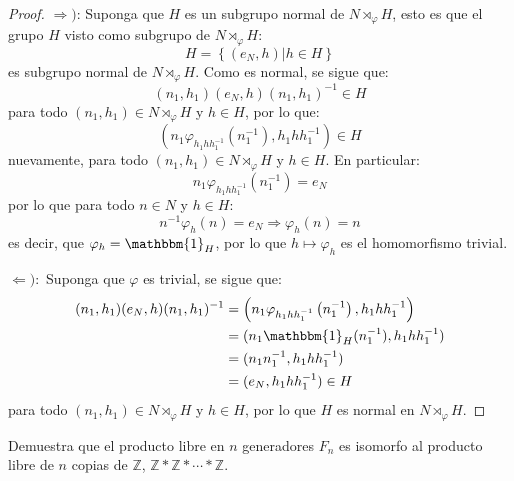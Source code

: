 \documentclass[12pt]{report}
\newcounter{it}
\theoremstyle{largebreak}
\newcommand{\bbm}[1]{\ensuremath{\mathbbm{#1}}}
\begin{document}
\begin{proof}
        $\Rightarrow)$: Suponga que $H$ es un subgrupo normal de $N\rtimes_\varphi H$, esto es que el grupo $H$ visto como subgrupo de $N\rtimes_\varphi H$:
        \begin{equation*}
            H=\left\{(e_N,h)\Big|h\in H \right\}
        \end{equation*}
        es subgrupo normal de $N\rtimes_\varphi H$. Como es normal, se sigue que:
        \begin{equation*}
            (n_1,h_1)(e_N,h)(n_1,h_1)^{-1}\in H
        \end{equation*}
        para todo $(n_1,h_1)\in N\rtimes_{\varphi}H$ y $h\in H$, por lo que:
        \begin{equation*}
            \left(n_1\varphi_{h_1h h_1^{-1}}\left(n_1^{-1}\right),h_1hh_1^{-1} \right)\in H
        \end{equation*}
        nuevamente, para todo $(n_1,h_1)\in N\rtimes_{\varphi}H$ y $h\in H$. En particular:
        \begin{equation*}
            n_1\varphi_{h_1h h_1^{-1}}\left(n_1^{-1}\right)=e_N
        \end{equation*}
        por lo que para todo $n\in N$ y $h\in H$:
        \begin{equation*}
            n^{-1}\varphi_{h}\left(n\right)=e_N\Rightarrow\varphi_h(n)=n
        \end{equation*}
        es decir, que $\varphi_h=\bbm{1}_H$, por lo que $h\mapsto \varphi_h$ es el homomorfismo trivial.
        
        $\Leftarrow):$ Suponga que $\varphi$ es trivial, se sigue que:
        \begin{equation*}
            \begin{split}
                (n_1,h_1)(e_N,h)(n_1,h_1)^{-1}&=\left(n_1\varphi_{h_1h h_1^{-1}}\left(n_1^{-1}\right),h_1hh_1^{-1} \right)\\
                &=(n_1\bbm{1}_H(n_1^{-1}),h_1hh_1^{-1})\\
                &=(n_1n_1^{-1},h_1hh_1^{-1})\\
                &=(e_N,h_1hh_1^{-1})\in H\\
            \end{split}
        \end{equation*}
        para todo $(n_1,h_1)\in N\rtimes_{\varphi}H$ y $h\in H$, por lo que $H$ es normal en $N\rtimes_{\varphi}H$.
    \end{proof}

    \begin{excer}
        Demuestra que el producto libre en $n$ generadores $F_n$ es isomorfo al producto libre de $n$ copias de $\mathbb{Z}$, $\mathbb{Z}*\mathbb{Z}*\cdots*\mathbb{Z}$.
    \end{excer}
\end{document}
